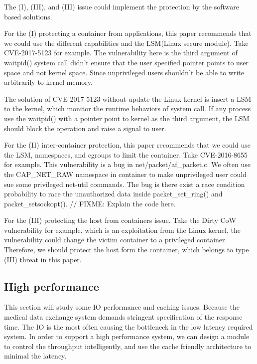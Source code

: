 \documentclass[12pt,a4paper]{IEEEconf}
\begin{document}
The (\RN{1}), (\RN{3}), and (\RN{3}) issue could implement the protection by the software
based solutions.

For the (\RN{1}) protecting a container from applications, this paper recommends that
we could use the different capabilities and the LSM(Linux secure module). Take
CVE-2017-5123\cite{CVE-2017-5123} for example. The vulnerability here is the third argument of
waitpid() system call didn't ensure that the user specified pointer points to user space
and not kernel space. Since unprivileged users shouldn’t be able to write arbitrarily
to kernel memory.

The solution of CVE-2017-5123 without update the Linux kernel is insert a
LSM to the kernel, which monitor the runtime behaviors of system call. If any process
use the waitpid() with a pointer point to kernel as the third argument, the LSM should block
the operation and raise a signal to user.

For the (\RN{2}) inter-container protection, this paper recommends that we could use the
LSM, namespaces, and cgroups to limit the container. Take CVE-2016-8655\cite{CVE-2016-8655}
for example. This vulnerability is a bug in net/packet/af\_packet.c. We often use the
CAP\_NET\_RAW namespace in container to make unprivileged user could sue some privileged
net-util commands. The bug is there exist a race condition probability to race the unauthorized
data inside packet\_set\_ring() and packet\_setsockopt()\cite{CVE-2016-8655-lwn}.
// FIXME: Explain the code here.

For the (\RN{3}) protecting the host from containers issue.
Take the Dirty CoW vulnerability for example, which is an exploitation from the Linux kernel,
the vulnerability could change the victim container to a privileged container. Therefore, we should
protect the host form the container, which belongs to type (\RN{3}) threat in this paper.

\subsection{High performance}
\hypertarget{heigh_performance}{}
This section will study some IO performance and caching issues. Because the medical
data exchange system demands stringent specification of the response time.
The IO is the most often causing the bottleneck in the low latency required system.
In order to support a high performance system, we can design a module to control
the throughput intelligently, and use the cache friendly architecture to minimal the
latency.
\end{document}
